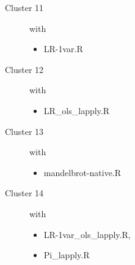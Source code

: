 \documentclass[12pt]{article}
\begin{document}
{\begin{description}
\item[Cluster 11] with
 \begin{itemize}
\item LR-1var.R
 \end{itemize}

\item[Cluster 12] with
 \begin{itemize}
\item LR\_ols\_lapply.R
 \end{itemize}

\item[Cluster 13] with
 \begin{itemize}
\item mandelbrot-native.R
 \end{itemize}

\item[Cluster 14] with
 \begin{itemize}
\item LR-1var\_ols\_lapply.R, 
\item Pi\_lapply.R
 \end{itemize}
\end{description}
}
\end{document}
